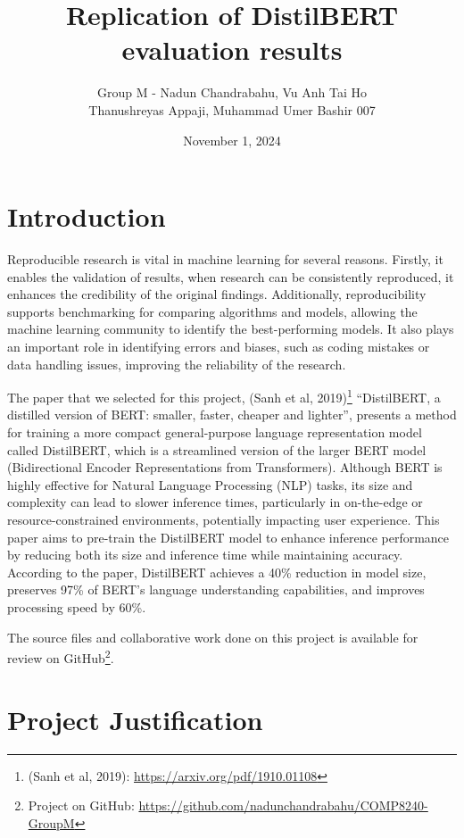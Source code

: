 \documentclass[
  11pt,
]{article}
\title{Replication of DistilBERT evaluation results}
\author{Group M - Nadun Chandrabahu, Vu Anh Tai Ho\\
Thanushreyas Appaji, Muhammad Umer Bashir 007}
\date{November 1, 2024}
\begin{document}
\maketitle

\section{Introduction}\label{introduction}

Reproducible research is vital in machine learning for several reasons.
Firstly, it enables the validation of results, when research can be
consistently reproduced, it enhances the credibility of the original
findings. Additionally, reproducibility supports benchmarking for
comparing algorithms and models, allowing the machine learning community
to identify the best-performing models. It also plays an important role
in identifying errors and biases, such as coding mistakes or data
handling issues, improving the reliability of the research.

The paper that we selected for this project, (Sanh et al,
2019)\footnote{(Sanh et al, 2019):
  \url{https://arxiv.org/pdf/1910.01108}} ``DistilBERT, a distilled
version of BERT: smaller, faster, cheaper and lighter'', presents a
method for training a more compact general-purpose language
representation model called DistilBERT, which is a streamlined version
of the larger BERT model (Bidirectional Encoder Representations from
Transformers). Although BERT is highly effective for Natural Language
Processing (NLP) tasks, its size and complexity can lead to slower
inference times, particularly in on-the-edge or resource-constrained
environments, potentially impacting user experience. This paper aims to
pre-train the DistilBERT model to enhance inference performance by
reducing both its size and inference time while maintaining accuracy.
According to the paper, DistilBERT achieves a 40\% reduction in model
size, preserves 97\% of BERT's language understanding capabilities, and
improves processing speed by 60\%.

The source files and collaborative work done on this project is
available for review on GitHub\footnote{Project on GitHub:
  \url{https://github.com/nadunchandrabahu/COMP8240-GroupM}}.

\section{Project Justification}\label{project-justification}
\end{document}
